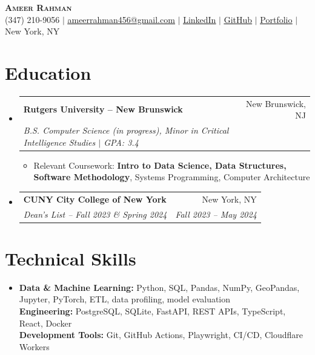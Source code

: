 \documentclass[letterpaper,10pt]{article}
\makeatletter
\newcommand{\resumeItem}[1]{\item\small{#1}}
\newcommand{\resumeSubheading}[4]{
  \vspace{1pt}\item
  \begin{tabular*}{0.97\textwidth}[t]{l@{\extracolsep{\fill}}r}
    \textbf{#1} & #2 \\
    \textit{\small #3} & \textit{\small #4} \\
  \end{tabular*}\vspace{-3pt}
}
\newcommand{\resumeSubHeadingListStart}{\begin{itemize}[leftmargin=0.15in,label={},itemsep=0pt,topsep=0pt]}
\newcommand{\resumeSubHeadingListEnd}{\end{itemize}}
\newcommand{\resumeItemListStart}{\begin{itemize}[leftmargin=0.15in,label=\textbullet,itemsep=-2pt,topsep=0pt]}
\newcommand{\resumeItemListEnd}{\end{itemize}\vspace{0pt}}
\makeatother
\begin{document}
\begin{center}
  {\Huge\scshape\textbf{Ameer Rahman}} \\ \vspace{2pt}
  \small (347) 210-9056 $|$
  \href{mailto:ameerrahman456@gmail.com}{\underline{ameerrahman456@gmail.com}} $|$
  \href{https://www.linkedin.com/in/ameer-rahman-a3bb232a0/}{\underline{LinkedIn}} $|$
  \href{https://github.com/ameer-rah}{\underline{GitHub}} $|$
  \href{https://ameer-rahman.info/}{\underline{Portfolio}} $|$ New York, NY
\end{center}

\section{Education}
\resumeSubHeadingListStart
  \resumeSubheading{Rutgers University -- New Brunswick}{New Brunswick, NJ}
    {B.S. Computer Science (in progress), Minor in Critical Intelligence Studies $|$ GPA: 3.4}{}
    \resumeItemListStart
      \resumeItem{Relevant Coursework: \textbf{Intro to Data Science, Data Structures, Software Methodology}, Systems Programming, Computer Architecture}
    \resumeItemListEnd
  \resumeSubheading{CUNY City College of New York}{New York, NY}
    {Dean's List -- Fall 2023 \& Spring 2024}{Fall 2023 -- May 2024}
\resumeSubHeadingListEnd

\section{Technical Skills}
\begin{itemize}[leftmargin=0.15in,label={},topsep=0pt]
  \small\item{
    \textbf{Data \& Machine Learning:} Python, SQL, Pandas, NumPy, GeoPandas, Jupyter, PyTorch, ETL, data profiling, model evaluation \\
    \textbf{Engineering:} PostgreSQL, SQLite, FastAPI, REST APIs, TypeScript, React, Docker \\
    \textbf{Development Tools:} Git, GitHub Actions, Playwright, CI/CD, Cloudflare Workers
  }
\end{itemize}
\end{document}
